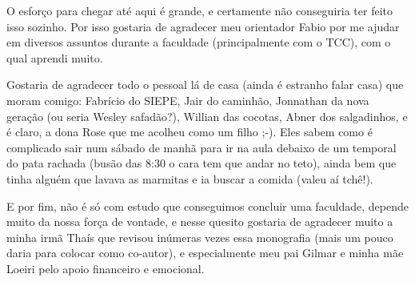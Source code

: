 \begin{agradecimentos}

O esforço para chegar até aqui é grande, e certamente não conseguiria ter feito isso sozinho. Por isso gostaria de agradecer meu orientador Fabio por me ajudar em diversos assuntos durante a faculdade (principalmente com o TCC), com o qual aprendi muito. 

Gostaria de agradecer todo o pessoal lá de casa (ainda é estranho falar casa) que moram comigo: Fabrício do SIEPE, Jair do caminhão, Jonnathan da nova geração (ou seria Wesley safadão?), Willian das cocotas, Abner dos salgadinhos, e é claro, a dona Rose que me acolheu como um filho ;-). Eles sabem como é complicado sair num sábado de manhã para ir na aula debaixo de um temporal do pata rachada (busão das 8:30 o cara tem que andar no teto), ainda bem que tinha alguém que lavava as marmitas e ia buscar a comida (valeu aí tchê!). 

E por fim, não é só com estudo que conseguimos concluir uma faculdade, depende muito da nossa força de vontade, e nesse quesito gostaria de agradecer muito a minha irmã Thaís que revisou inúmeras vezes essa monografia (mais um pouco daria para colocar como co-autor), e especialmente meu pai Gilmar e minha mãe Loeiri pelo apoio financeiro e emocional.


\end{agradecimentos}